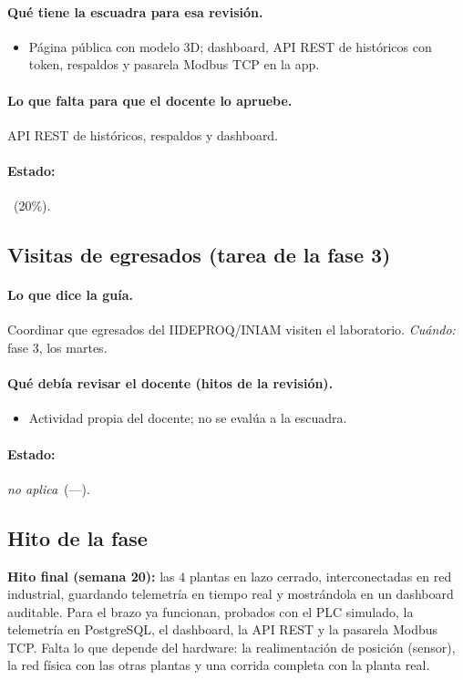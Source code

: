 \documentclass[a4paper,11pt]{article}
\begin{document}
\paragraph{Qué tiene la escuadra para esa revisión.}
\begin{itemize}
\item Página pública con modelo 3D; dashboard, API REST de históricos con token, respaldos y pasarela Modbus TCP en la app.
\end{itemize}
\paragraph{Lo que falta para que el docente lo apruebe.} API REST de históricos, respaldos y dashboard.
\paragraph{Estado:} \parcial~(20\%).
\subsection{Visitas de egresados (tarea de la fase 3)}
\paragraph{Lo que dice la guía.} Coordinar que egresados del IIDEPROQ/INIAM visiten el laboratorio. \textit{Cuándo:} fase 3, los martes.
\paragraph{Qué debía revisar el docente (hitos de la revisión).}
\begin{itemize}
\item[$\square$] Actividad propia del docente; no se evalúa a la escuadra.
\end{itemize}
\paragraph{Estado:} \textit{no aplica}~(—).
\subsection{Hito de la fase}
\textbf{Hito final (semana 20):} las 4 plantas en lazo cerrado, interconectadas en red industrial, guardando telemetría en tiempo real y mostrándola en un dashboard auditable. Para el brazo ya funcionan, probados con el PLC simulado, la telemetría en PostgreSQL, el dashboard, la API REST y la pasarela Modbus TCP. Falta lo que depende del hardware: la realimentación de posición (sensor), la red física con las otras plantas y una corrida completa con la planta real.
\end{document}
